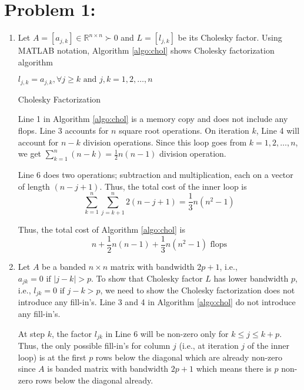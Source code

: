 \section*{Problem 1:}
\begin{enumerate}
\item Let $A = [a_{j,k}] \in \mathbb{R}^{n\times n} \succ 0$ and $L = [l_{j,k}]$ be its Cholesky factor. Using MATLAB notation, Algorithm \ref{algo:chol} shows Cholesky factorization algorithm

\begin{algorithm}[H]
\SetAlgoLined
{}
 $l_{j,k} = a_{j,k}, \forall j\geq k \text{\ and\ }  j,k= 1,2, \ldots, n$ \\
 \caption{Cholesky Factorization}
\label{algo:chol}
\end{algorithm}

\noindent Line 1 in Algorithm \ref{algo:chol} is a memory copy and does not include any flops. Line 3 accounts for $n$ square root operations. On iteration $k$, Line 4 will account for $n-k$ division operations. Since this loop goes from $k= 1,2, \ldots, n $, we get $\sum_{k=1}^{n}(n-k) = \frac{1}{2}n(n-1)$ division operation.

\noindent Line 6 does two operations; subtraction and multiplication, each on a vector of length $(n-j+1)$. Thus, the total cost of the inner loop is 
$$
\sum_{k=1}^{n} \sum_{j=k+1}^{n} 2(n-j+1) = \frac{1}{3}n(n^{2}-1)
$$

Thus, the total cost of Algorithm \ref{algo:chol} is 
$$
n + \frac{1}{2}n(n-1) + \frac{1}{3}n(n^2-1) \text{\ flops}
$$

\item 
Let $A$ be a banded $n\times n$ matrix with bandwidth $2p+1$, i.e., $a_{jk}=0 \text{\ if\ } |j-k|>p$. To show that Cholesky factor $L$ has lower bandwidth $p$, i.e.,  $l_{jk}=0 \text{\ if\ } j-k>p$, we need to show the Cholesky factorization does not introduce any fill-in's. Line 3 and 4 in Algorithm \ref{algo:chol} do not introduce any fill-in's. 

At step $k$, the factor $l_{jk}$ in Line 6 will be non-zero only for $k \leq j \leq k+p$. Thus, the only possible fill-in's for column $j$ (i.e., at iteration $j$ of the inner loop) is at the first $p$ rows below the diagonal which are already non-zero since $A$ is banded matrix with bandwidth $2p+1$ which means there is $p$ non-zero rows below the diagonal already. 


\end{enumerate}
